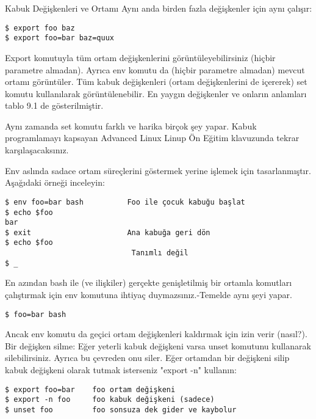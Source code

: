 \begin{section}{Kabuk Değişkenleri ve Ortamı}
Aynı anda birden fazla değişkenler için aynı çalışır:
\begin{verbatim}
$ export foo baz
$ export foo=bar baz=quux
\end{verbatim}

Export komutuyla tüm ortam değişkenlerini görüntüleyebilirsiniz (hiçbir parametre almadan). Ayrıca env komutu da (hiçbir parametre almadan) mevcut ortamı görüntüler. Tüm kabuk değişkenleri (ortam değişkenlerini de içererek) set komutu kullanılarak görüntülenebilir. En yaygın değişkenler ve onların anlamları tablo 9.1 de gösterilmiştir.

Aynı zamanda set komutu farklı ve harika birçok şey yapar. Kabuk programlamayı kapsayan Advanced Linux Linup Ön Eğitim klavuzunda tekrar karşılaşacaksınız.

Env aslında sadace ortam süreçlerini göstermek yerine işlemek için tasarlanmıştır. Aşağıdaki örneği inceleyin:
\begin{verbatim}
$ env foo=bar bash          Foo ile çocuk kabuğu başlat
$ echo $foo
bar
$ exit                      Ana kabuğa geri dön
$ echo $foo
                             Tanımlı değil
$ _
\end{verbatim}

En azından bash ile (ve ilişkiler) gerçekte genişletilmiş bir ortamla komutları çalıştırmak için env komutuna ihtiyaç duymazsınız.-Temelde aynı şeyi yapar.
\begin{verbatim}
$ foo=bar bash
\end{verbatim}

Ancak env komutu da geçici ortam değişkenleri kaldırmak için izin verir (nasıl?). Bir değişken silme: Eğer yeterli kabuk değişkeni varsa unset komutunu kullanarak silebilirsiniz. Ayrıca bu çevreden onu siler. Eğer ortamdan bir değişkeni silip kabuk değişkeni olarak tutmak isterseniz "export -n" kullanın:
\begin{verbatim}
$ export foo=bar 	foo ortam değişkeni
$ export -n foo 	foo kabuk değişkeni (sadece)
$ unset foo 		foo sonsuza dek gider ve kaybolur
\end{verbatim}
\end{section}
